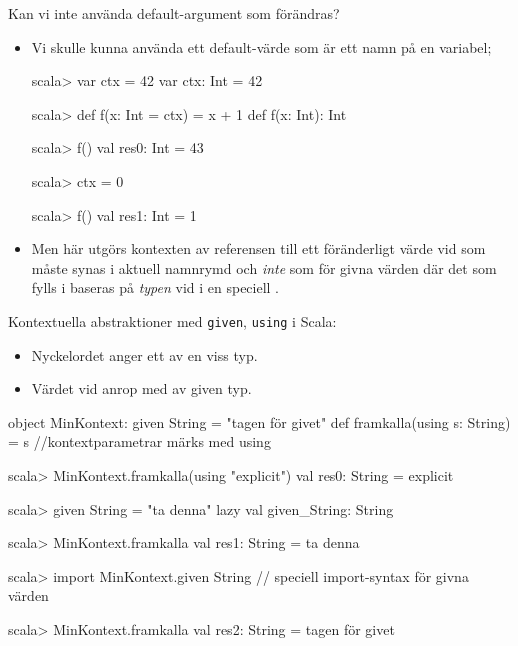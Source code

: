 \begin{Slide}{Kan vi inte använda default-argument som förändras?}
\begin{itemize}\SlideFontSmall
\item Vi skulle kunna använda ett default-värde som är ett namn på en variabel;
\begin{REPLsmall}
scala> var ctx = 42
var ctx: Int = 42

scala> def f(x: Int = ctx) = x + 1
def f(x: Int): Int

scala> f()
val res0: Int = 43

scala> ctx = 0

scala> f()                                                                      
val res1: Int = 1
\end{REPLsmall} 
\item Men här utgörs kontexten av referensen till ett föränderligt värde vid  som måste synas i aktuell namnrymd och \emph{inte} som för givna värden där det som fylls i baseras på \emph{typen} vid  i en speciell  .
\end{itemize}
\end{Slide}
\begin{Slide}{Kontextuella abstraktioner med \texttt{given}, \texttt{using}}\SlideFontSmall
{}  i Scala:
\begin{itemize}\SlideFontSmall
\item Nyckelordet  anger ett  av en viss typ.
\item Värdet  vid anrop med  av given typ.
\end{itemize}
\begin{Code}
object MinKontext:
  given String = "tagen för givet"
  def framkalla(using s: String) = s  //kontextparametrar märks med using
\end{Code}
\pause\vspace{-0.9em}
\begin{REPLsmall}
scala> MinKontext.framkalla(using "explicit")
val res0: String = explicit

scala> given String = "ta denna"
lazy val given_String: String

scala> MinKontext.framkalla
val res1: String = ta denna

scala> import MinKontext.given String    // speciell import-syntax för givna värden

scala> MinKontext.framkalla
val res2: String = tagen för givet
\end{REPLsmall}
\end{Slide}


